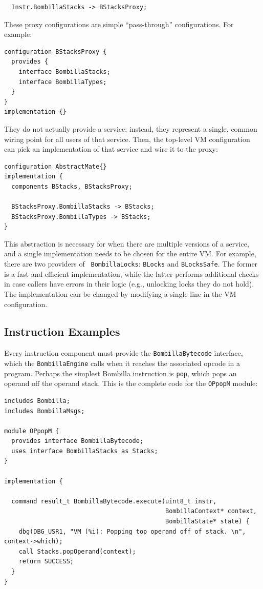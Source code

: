 \documentclass[10pt]{article}
\newcommand{\bomb}{Bombilla\xspace}
\begin{document}
\begin{verbatim}
  Instr.BombillaStacks -> BStacksProxy;
\end{verbatim}

These proxy configurations are simple ``pass-through''
configurations. For example:

\begin{verbatim}
configuration BStacksProxy {
  provides {
    interface BombillaStacks;
    interface BombillaTypes;
  }
}
implementation {}
\end{verbatim}

They do not actually provide a service; instead, they represent a
single, common wiring point for all users of that service. Then, the
top-level VM configuration can pick an implementation of that service and
wire it to the proxy:

\begin{verbatim}
configuration AbstractMate{}
implementation {
  components BStacks, BStacksProxy;

  BStacksProxy.BombillaStacks -> BStacks;
  BStacksProxy.BombillaTypes -> BStacks;
}
\end{verbatim}

This abstraction is necessary for when there are multiple versions of
a service, and a single implementation needs to be chosen for the
entire VM. For example, there are two providers of {\tt
BombillaLocks}: {\tt BLocks} and {\tt BLocksSafe}. The former is a
fast and efficient implementation, while the latter performs
additional checks in case callers have errors in their logic (e.g.,
unlocking locks they do not hold). The implementation can be changed
by modifying a single line in the VM configuration.

\subsection{Instruction Examples}

Every instruction component must provide the {\tt BombillaBytecode}
interface, which the {\tt BombillaEngine} calls when it reaches the
associated opcode in a program. Perhaps the simplest \bomb instruction
is {\tt pop}, which pops an operand off the operand stack. This is the
complete code for the {\tt OPpopM} module:

\begin{verbatim}
includes Bombilla;
includes BombillaMsgs;

module OPpopM {
  provides interface BombillaBytecode;
  uses interface BombillaStacks as Stacks;
}

implementation {

  command result_t BombillaBytecode.execute(uint8_t instr,
                                            BombillaContext* context,
                                            BombillaState* state) {
    dbg(DBG_USR1, "VM (%i): Popping top operand off of stack. \n", context->which);
    call Stacks.popOperand(context);
    return SUCCESS;
  }
}
\end{verbatim}
\end{document}
